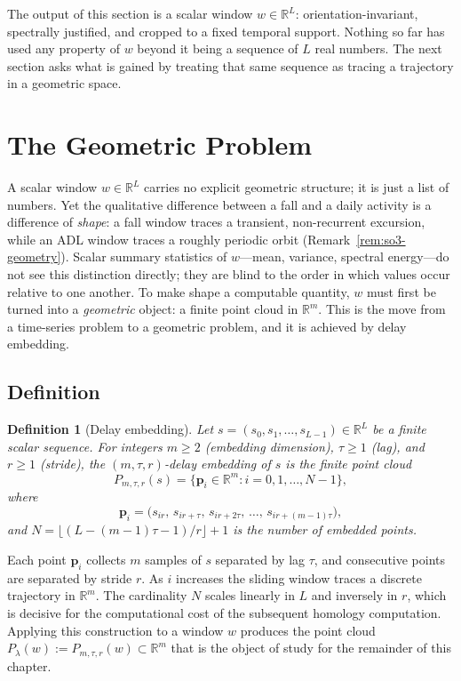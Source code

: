\documentclass[onluarkali,ingilizce,yukseklisans,karton,LisansustuEgitim]{itutez}
\newtheorem{definition}{Definition}[chapter]
\providecommand{\R}{\mathbb{R}}
\providecommand{\1}{\mathbf{1}}
\begin{document}
The output of this section is a scalar window $w\in\R^L$: orientation-invariant, spectrally justified, and cropped to a fixed temporal support. Nothing so far has used any property of $w$ beyond it being a sequence of $L$ real numbers. The next section asks what is gained by treating that same sequence as tracing a trajectory in a geometric space.

\section{The Geometric Problem}
\label{subsec:embedding}

A scalar window $w\in\R^L$ carries no explicit geometric structure; it is just a list of numbers. Yet the qualitative difference between a fall and a daily activity is a difference of \emph{shape}: a fall window traces a transient, non-recurrent excursion, while an ADL window traces a roughly periodic orbit (Remark~\ref{rem:so3-geometry}). Scalar summary statistics of $w$---mean, variance, spectral energy---do not see this distinction directly; they are blind to the order in which values occur relative to one another. To make shape a computable quantity, $w$ must first be turned into a \emph{geometric} object: a finite point cloud in $\R^m$. This is the move from a time-series problem to a geometric problem, and it is achieved by delay embedding.

\subsection{Definition}
\label{subsubsec:delay_def}

\begin{definition}[Delay embedding]
\label{def:delay}
Let $s=(s_0,s_1,\ldots,s_{L-1})\in\R^L$ be a finite scalar sequence. For integers $m\geq 2$ (embedding dimension), $\tau\geq 1$ (lag), and $r\geq 1$ (stride), the \emph{$(m,\tau,r)$-delay embedding} of $s$ is the finite point cloud
\begin{equation}
  P_{m,\tau,r}(s)=\bigl\{\mathbf{p}_i\in\R^m:i=0,1,\ldots,N-1\bigr\},
  \label{eq:delay-emb}
\end{equation}
where
\[
  \mathbf{p}_i=\bigl(s_{ir},\,s_{ir+\tau},\,s_{ir+2\tau},\,\ldots,\,s_{ir+(m-1)\tau}\bigr),
\]
and $N=\lfloor(L-(m-1)\tau-1)/r\rfloor+1$ is the number of embedded points.
\end{definition}

Each point $\mathbf{p}_i$ collects $m$ samples of $s$ separated by lag $\tau$, and consecutive points are separated by stride $r$. As $i$ increases the sliding window traces a discrete trajectory in $\R^m$. The cardinality $N$ scales linearly in $L$ and inversely in $r$, which is decisive for the computational cost of the subsequent homology computation. Applying this construction to a window $w$ produces the point cloud $P_\lambda(w):=P_{m,\tau,r}(w)\subset\R^m$ that is the object of study for the remainder of this chapter.
\end{document}
